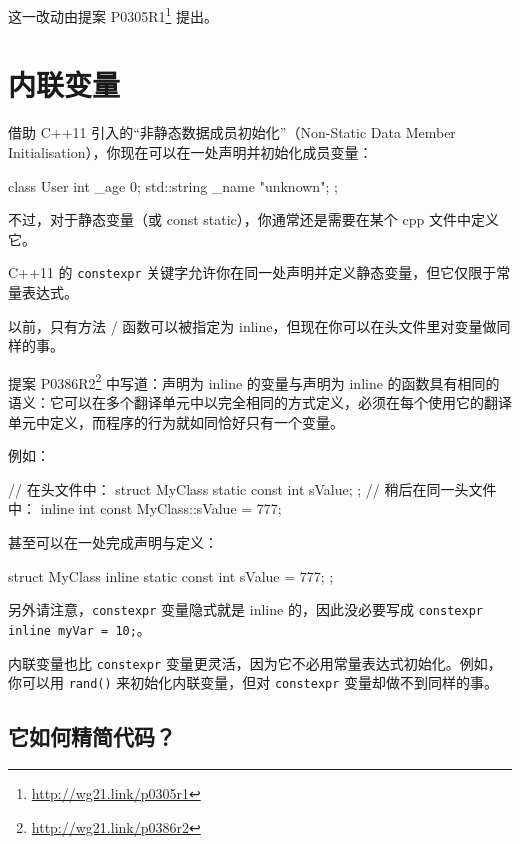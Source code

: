 \begin{myInfoBox}
这一改动由提案 P0305R1\footnote{\url{http://wg21.link/p0305r1}} 提出。
\end{myInfoBox}

\section{内联变量}

借助 C++11 引入的“非静态数据成员初始化”（Non-Static Data Member Initialisation），你现在可以在一处声明并初始化成员变量：

\begin{codebox}[cpp]
class User
{
int _age {0};
std::string _name {"unknown"};
};
\end{codebox}

不过，对于静态变量（或 const static），你通常还是需要在某个 cpp 文件中定义它。

C++11 的 \texttt{constexpr} 关键字允许你在同一处声明并定义静态变量，但它仅限于常量表达式。

以前，只有方法 / 函数可以被指定为 inline，但现在你可以在头文件里对变量做同样的事。

提案 P0386R2\footnote{\url{http://wg21.link/p0386r2}} 中写道：声明为 inline 的变量与声明为 inline 的函数具有相同的语义：它可以在多个翻译单元中以完全相同的方式定义，必须在每个使用它的翻译单元中定义，而程序的行为就如同恰好只有一个变量。

例如：

\begin{codebox}[cpp]
// 在头文件中：
struct MyClass
{
static const int sValue;
};
// 稍后在同一头文件中：
inline int const MyClass::sValue = 777;
\end{codebox}

甚至可以在一处完成声明与定义：

\begin{codebox}[cpp]
struct MyClass
{
inline static const int sValue = 777;
};
\end{codebox}

另外请注意，\texttt{constexpr} 变量隐式就是 inline 的，因此没必要写成 \texttt{constexpr inline myVar = 10;}。

内联变量也比 \texttt{constexpr} 变量更灵活，因为它不必用常量表达式初始化。例如，你可以用 \texttt{rand()} 来初始化内联变量，但对 \texttt{constexpr} 变量却做不到同样的事。

\subsection{它如何精简代码？}

